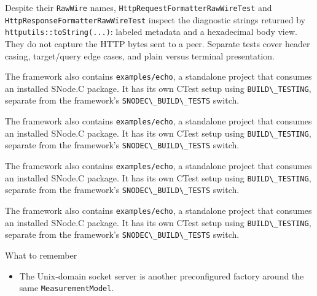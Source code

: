 \documentclass[
  a4paper,
  openany]{book}
\providecommand{\tightlist}{%
  \setlength{\itemsep}{0pt}\setlength{\parskip}{0pt}}
\providecommand{\passthrough}[1]{#1}
\begin{document}
Despite their \passthrough{\lstinline!RawWire!} names,
\passthrough{\lstinline!HttpRequestFormatterRawWireTest!} and
\passthrough{\lstinline!HttpResponseFormatterRawWireTest!} inspect the
diagnostic strings returned by
\passthrough{\lstinline!httputils::toString(...)!}: labeled metadata and
a hexadecimal body view. They do not capture the HTTP bytes sent to a
peer. Separate tests cover header casing, target/query edge cases, and
plain versus terminal presentation.\par
\clearpage
{}
The framework also contains \passthrough{\lstinline!examples/echo!}, a
standalone project that consumes an installed SNode.C package. It has
its own CTest setup using \passthrough{\lstinline!BUILD\_TESTING!},
separate from the framework's
\passthrough{\lstinline!SNODEC\_BUILD\_TESTS!} switch.\par
\clearpage
{}
The framework also contains \passthrough{\lstinline!examples/echo!}, a
standalone project that consumes an installed SNode.C package. It has
its own CTest setup using \passthrough{\lstinline!BUILD\_TESTING!},
separate from the framework's
\passthrough{\lstinline!SNODEC\_BUILD\_TESTS!} switch.\par
\clearpage
{}
The framework also contains \passthrough{\lstinline!examples/echo!}, a
standalone project that consumes an installed SNode.C package. It has
its own CTest setup using \passthrough{\lstinline!BUILD\_TESTING!},
separate from the framework's
\passthrough{\lstinline!SNODEC\_BUILD\_TESTS!} switch.\par
\clearpage
{}
\begingroup\raggedright The framework also contains \passthrough{\lstinline!examples/echo!}, a
standalone project that consumes an installed SNode.C package. It has
its own CTest setup using \passthrough{\lstinline!BUILD\_TESTING!},
separate from the framework's
\passthrough{\lstinline!SNODEC\_BUILD\_TESTS!} switch.\par\endgroup
\clearpage
{}
\begin{snodecrememberbox}{What to remember}\begin{itemize}\tightlist\item The Unix-domain socket server is another preconfigured factory around
  the same \passthrough{\lstinline!MeasurementModel!}.\par\end{itemize}\end{snodecrememberbox}
\end{document}

